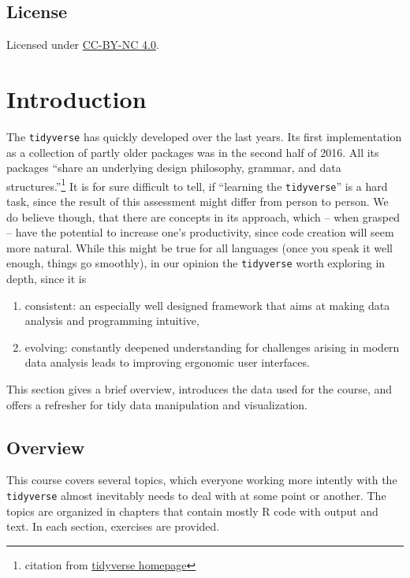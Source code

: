 \documentclass[]{book}
\providecommand{\tightlist}{%
  \setlength{\itemsep}{0pt}\setlength{\parskip}{0pt}}
\let\rmarkdownfootnote\footnote%
\def\footnote{\protect\rmarkdownfootnote}
\begin{document}
\hypertarget{license}{%
\section*{License}\label{license}}

Licensed under \href{https://creativecommons.org/licenses/by-nc/4.0/}{CC-BY-NC 4.0}.

\hypertarget{introduction}{%
\chapter{Introduction}\label{introduction}}

The \texttt{tidyverse} has quickly developed over the last years.
Its first implementation as a collection of partly older packages was in the second half of 2016.
All its packages ``share an underlying design philosophy, grammar, and data structures.''\footnote{citation from \href{https://www.tidyverse.org/}{tidyverse homepage}}
It is for sure difficult to tell, if ``learning the \texttt{tidyverse}'' is a hard task, since the result of this assessment might differ from person to person.
We do believe though, that there are concepts in its approach, which -- when grasped -- have the potential to increase one's productivity, since code creation will seem more natural.
While this might be true for all languages (once you speak it well enough, things go smoothly), in our opinion the \texttt{tidyverse} worth exploring in depth, since it is

\begin{enumerate}
\def\labelenumi{\arabic{enumi}.}
\tightlist
\item
  consistent: an especially well designed framework that aims at making data analysis and programming intuitive,
\item
  evolving: constantly deepened understanding for challenges arising in modern data analysis leads to improving ergonomic user interfaces.
\end{enumerate}

This section gives a brief overview, introduces the data used for the course, and offers a refresher for tidy data manipulation and visualization.

\hypertarget{overview}{%
\section{Overview}\label{overview}}

This course covers several topics, which everyone working more intently with the \texttt{tidyverse} almost inevitably needs to deal with at some point or another.
The topics are organized in chapters that contain mostly R code with output and text.
In each section, exercises are provided.
\end{document}
